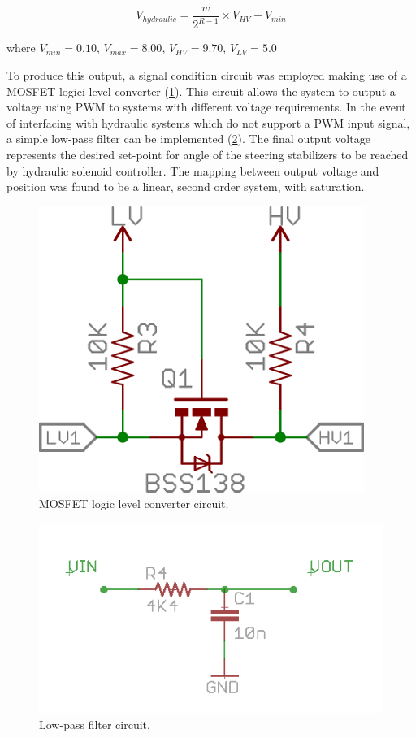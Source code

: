 \documentclass[authoryear]{elsarticle}
\begin{document}
\begin{equation}
  V_{hydraulic} = \frac{w}{2^{R-1}} \times V_{HV} + V_{min}
  \label{eq:v_out}
\end{equation}
\begin{flushleft}
where $V_{min}=0.10$, $V_{max}=8.00$, $V_{HV}=9.70$, $V_{LV}=5.0$
\end{flushleft}

To produce this output, a signal condition circuit was employed making
use of a MOSFET logici-level converter (\ref{fig:mosfet}). This
circuit allows the system to output a voltage using PWM to systems with different voltage
requirements. In the event of interfacing with hydraulic systems which
do not support a PWM input signal, a simple low-pass filter can be
implemented (\ref{fig:lowpass}). The final output voltage represents the desired
set-point for angle of the steering stabilizers to be reached by
hydraulic solenoid controller. The mapping between output voltage and
position was found to be a linear, second order system, with
saturation.

\begin{figure}
  \centering
  \includegraphics[scale=0.3,natwidth=610,natheight=642]{mosfet.png}
  \caption{MOSFET logic level converter circuit.}
  \label{fig:mosfet}
\end{figure}

\begin{figure}
  \centering
  \includegraphics[scale=0.3,natwidth=610,natheight=642]{lowpass.png}
  \caption{Low-pass filter circuit.}
  \label{fig:lowpass}
\end{figure}
\end{document}
